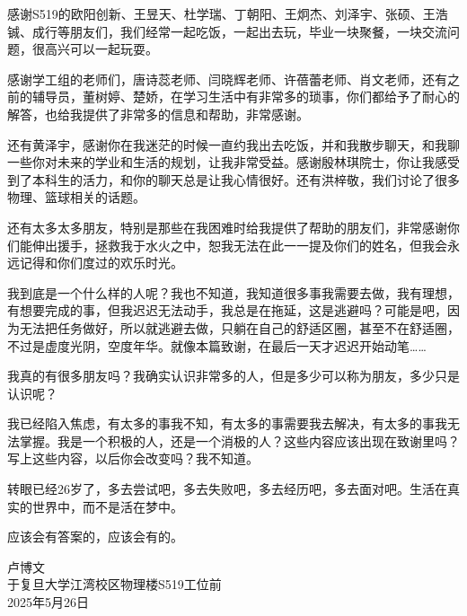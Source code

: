 \documentclass[type=master]{fduthesis}
\begin{document}
\begin{acknowledgements}
  感谢S519的欧阳创新、王昱天、杜学瑞、丁朝阳、王炯杰、刘泽宇、张硕、王浩铖、成行等朋友们，我们经常一起吃饭，一起出去玩，毕业一块聚餐，一块交流问题，很高兴可以一起玩耍。

  感谢学工组的老师们，唐诗蕊老师、闫晓辉老师、许蓓蕾老师、肖文老师，还有之前的辅导员，董树婷、楚娇，在学习生活中有非常多的琐事，你们都给予了耐心的解答，也给我提供了非常多的信息和帮助，非常感谢。

  还有黄泽宇，感谢你在我迷茫的时候一直约我出去吃饭，并和我散步聊天，和我聊一些你对未来的学业和生活的规划，让我非常受益。感谢殷林琪院士，你让我感受到了本科生的活力，和你的聊天总是让我心情很好。还有洪梓敬，我们讨论了很多物理、篮球相关的话题。

  还有太多太多朋友，特别是那些在我困难时给我提供了帮助的朋友们，非常感谢你们能伸出援手，拯救我于水火之中，恕我无法在此一一提及你们的姓名，但我会永远记得和你们度过的欢乐时光。

  我到底是一个什么样的人呢？我也不知道，我知道很多事我需要去做，我有理想，有想要完成的事，但我迟迟无法动手，我总是在拖延，这是逃避吗？可能是吧，因为无法把任务做好，所以就逃避去做，只躺在自己的舒适区圈，甚至不在舒适圈，不过是虚度光阴，空度年华。就像本篇致谢，在最后一天才迟迟开始动笔……

  我真的有很多朋友吗？我确实认识非常多的人，但是多少可以称为朋友，多少只是认识呢？

  我已经陷入焦虑，有太多的事我不知，有太多的事需要我去解决，有太多的事我无法掌握。我是一个积极的人，还是一个消极的人？这些内容应该出现在致谢里吗？写上这些内容，以后你会改变吗？我不知道。

  转眼已经26岁了，多去尝试吧，多去失败吧，多去经历吧，多去面对吧。生活在真实的世界中，而不是活在梦中。

  应该会有答案的，应该会有的。

  \begin{flushright}
    卢博文 \\
    于复旦大学江湾校区物理楼S519工位前\\
    2025年5月26日\\
  \end{flushright}
\end{acknowledgements}
\end{document}

